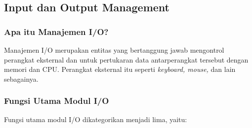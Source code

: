 \documentclass[12pt]{article}
\begin{document}
\subsection{Input dan Output Management} 
\subsubsection{Apa itu Manajemen I/O?} 
Manajemen I/O merupakan entitas yang bertanggung jawab mengontrol perangkat eksternal dan untuk pertukaran data antarperangkat tersebut dengan memori dan CPU. Perangkat eksternal itu seperti \textit{keyboard, mouse,} dan lain sebagainya.

\subsubsection{Fungsi Utama Modul I/O} 
Fungsi utama modul I/O dikategorikan menjadi lima, yaitu: 
\end{document}
